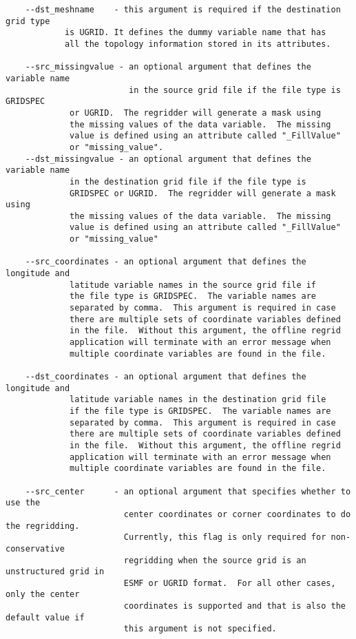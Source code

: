 \begin{verbatim}
    --dst_meshname    - this argument is required if the destination grid type
			is UGRID. It defines the dummy variable name that has
			all the topology information stored in its attributes.

    --src_missingvalue - an optional argument that defines the variable name 
                         in the source grid file if the file type is GRIDSPEC 
			 or UGRID.  The regridder will generate a mask using 
			 the missing values of the data variable.  The missing 
			 value is defined using an attribute called "_FillValue" 
			 or "missing_value". 
    --dst_missingvalue - an optional argument that defines the variable name
			 in the destination grid file if the file type is
			 GRIDSPEC or UGRID.  The regridder will generate a mask using
			 the missing values of the data variable.  The missing
			 value is defined using an attribute called "_FillValue"
			 or "missing_value"

    --src_coordinates - an optional argument that defines the longitude and
			 latitude variable names in the source grid file if
			 the file type is GRIDSPEC.  The variable names are
			 separated by comma.  This argument is required in case
			 there are multiple sets of coordinate variables defined
			 in the file.  Without this argument, the offline regrid
			 application will terminate with an error message when
			 multiple coordinate variables are found in the file.

    --dst_coordinates - an optional argument that defines the longitude and
			 latitude variable names in the destination grid file
			 if the file type is GRIDSPEC.  The variable names are
			 separated by comma.  This argument is required in case
			 there are multiple sets of coordinate variables defined
			 in the file.  Without this argument, the offline regrid
			 application will terminate with an error message when
			 multiple coordinate variables are found in the file.

    --src_center      - an optional argument that specifies whether to use the 
                        center coordinates or corner coordinates to do the regridding.
                        Currently, this flag is only required for non-conservative
                        regridding when the source grid is an unstructured grid in 
                        ESMF or UGRID format.  For all other cases, only the center
                        coordinates is supported and that is also the default value if
                        this argument is not specified.


\end{verbatim}
